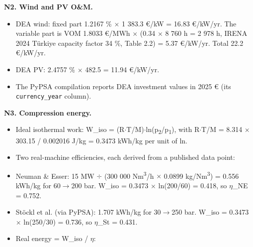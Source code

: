 \documentclass[11pt,a4paper]{article}
\begin{document}
\textbf{N2. Wind and PV O\&M.}

\begin{itemize}\setlength\itemsep{1pt}

  \item DEA wind: fixed part 1.2167 \% $\times$ 1 383.3 \euro{}/kW = 16.83 \euro{}/kW/yr. The variable part is VOM 1.8033 \euro{}/MWh $\times$ (0.34 $\times$ 8 760 h = 2 978 h, IRENA 2024 Türkiye capacity factor 34 \%, Table 2.2) = 5.37 \euro{}/kW/yr. Total 22.2 \euro{}/kW/yr.

  \item DEA PV: 2.4757 \% $\times$ 482.5 = 11.94 \euro{}/kW/yr.

  \item The PyPSA compilation reports DEA investment values in 2025 \euro{} (its \texttt{currency\_year} column).

\end{itemize}

\textbf{N3. Compression energy.}

\begin{itemize}\setlength\itemsep{1pt}

  \item Ideal isothermal work: W\_iso = (R$\cdot$T/M)$\cdot$ln(p\textsubscript{2}/p\textsubscript{1}), with R$\cdot$T/M = 8.314 $\times$ 303.15 / 0.002016 J/kg = 0.3473 kWh/kg per unit of ln.

  \item Two real-machine efficiencies, each derived from a published data point:

  \item Neuman \& Esser: 15 MW $\div$ (300 000 Nm\textsuperscript{3}/h $\times$ 0.0899 kg/Nm\textsuperscript{3}) = 0.556 kWh/kg for 60$\rightarrow$200 bar. W\_iso = 0.3473 $\times$ ln(200/60) = 0.418, so $\eta$\_NE = 0.752.

  \item Stöckl et al. (via PyPSA): 1.707 kWh/kg for 30$\rightarrow$250 bar. W\_iso = 0.3473 $\times$ ln(250/30) = 0.736, so $\eta$\_St = 0.431.

  \item Real energy = W\_iso / $\eta$:

\end{itemize}
\end{document}

